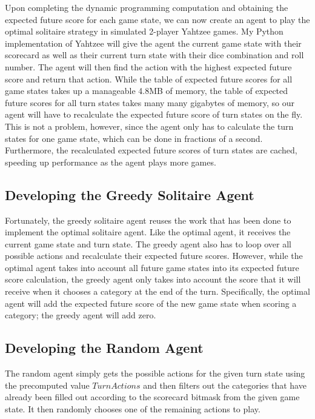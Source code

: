 \documentclass[12pt]{article}
\begin{document}
\noindent
Upon completing the dynamic programming computation and obtaining the expected future score for each game state, we can now create an agent to play the optimal solitaire strategy in simulated 2-player Yahtzee games. My Python implementation of Yahtzee will give the agent the current game state with their scorecard as well as their current turn state with their dice combination and roll number. The agent will then find the action with the highest expected future score and return that action. While the table of expected future scores for all game states takes up a manageable 4.8MB of memory, the table of expected future scores for all turn states takes many many gigabytes of memory, so our agent will have to recalculate the expected future score of turn states on the fly. This is not a problem, however, since the agent only has to calculate the turn states for one game state, which can be done in fractions of a second. Furthermore, the recalculated expected future scores of turn states are cached, speeding up performance as the agent plays more games.

\subsection{Developing the Greedy Solitaire Agent}
Fortunately, the greedy solitaire agent reuses the work that has been done to implement the optimal solitaire agent. Like the optimal agent, it receives the current game state and turn state. The greedy agent also has to loop over all possible actions and recalculate their expected future scores. However, while the optimal agent takes into account all future game states into its expected future score calculation, the greedy agent only takes into account the score that it will receive when it chooses a category at the end of the turn. Specifically, the optimal agent will add the expected future score of the new game state when scoring a category; the greedy agent will add zero.

\subsection{Developing the Random Agent}
The random agent simply gets the possible actions for the given turn state using the precomputed value $TurnActions$ and then filters out the categories that have already been filled out according to the scorecard bitmask from the given game state. It then randomly chooses one of the remaining actions to play.
\end{document}

